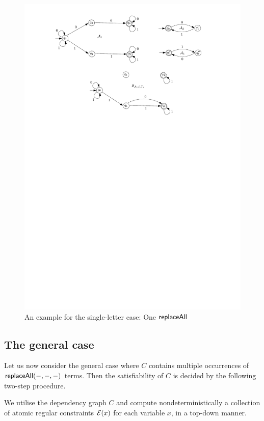 \begin{example}
\begin{figure}[htbp]
\begin{center}
\includegraphics[scale=0.65]{single-letter-example.pdf}
\end{center}
\caption{An example for the single-letter case: One $\mathsf{replaceAll}$}\label{fig-sl-exmp}
\end{figure}
\end{example}


\subsection{The general case}
\label{sec:dp-sl-general}

Let us now consider the general case where $C$ contains multiple occurrences of $\mathsf{replaceAll}(-, -, -)$ terms.
Then the satisfiability of $C$ is decided by the following two-step procedure.

\smallskip

 We utilise the dependency graph $C$ and compute nondeterministically a collection of atomic regular constraints $\mathcal{E}(x)$ for each variable $x$, in a top-down manner.

